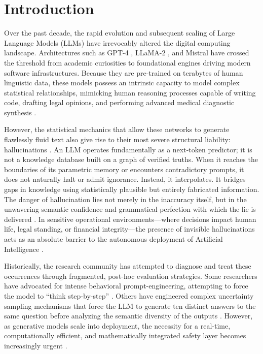 \documentclass{article}
\begin{document}
\section{Introduction}
\label{sec:introduction}

Over the past decade, the rapid evolution and subsequent scaling of Large Language Models (LLMs) have irrevocably altered the digital computing landscape. Architectures such as GPT-4 \cite{openai2023gpt4}, LLaMA-2 \cite{touvron2023llama2}, and Mistral \cite{jiang2023mistral} have crossed the threshold from academic curiosities to foundational engines driving modern software infrastructures. Because they are pre-trained on terabytes of human linguistic data, these models possess an intrinsic capacity to model complex statistical relationships, mimicking human reasoning processes capable of writing code, drafting legal opinions, and performing advanced medical diagnostic synthesis \cite{thirunavukarasu2023llmsmedicine}.

However, the statistical mechanics that allow these networks to generate flawlessly fluid text also give rise to their most severe structural liability: hallucinations \cite{alansari2024survey}. An LLM operates fundamentally as a next-token predictor; it is not a knowledge database built on a graph of verified truths. When it reaches the boundaries of its parametric memory or encounters contradictory prompts, it does not naturally halt or admit ignorance. Instead, it interpolates. It bridges gaps in knowledge using statistically plausible but entirely fabricated information. The danger of hallucination lies not merely in the inaccuracy itself, but in the unwavering semantic confidence and grammatical perfection with which the lie is delivered \cite{sharma2024trust}. In sensitive operational environments---where decisions impact human life, legal standing, or financial integrity---the presence of invisible hallucinations acts as an absolute barrier to the autonomous deployment of Artificial Intelligence \cite{huang2024trustllm}.

Historically, the research community has attempted to diagnose and treat these occurrences through fragmented, post-hoc evaluation strategies. Some researchers have advocated for intense behavioral prompt-engineering, attempting to force the model to ``think step-by-step'' \cite{wei2022chainofthought}. Others have engineered complex uncertainty sampling mechanisms that force the LLM to generate ten distinct answers to the same question before analyzing the semantic diversity of the outputs \cite{farquhar2024semantic}. However, as generative models scale into deployment, the necessity for a real-time, computationally efficient, and mathematically integrated safety layer becomes increasingly urgent \cite{kang2025uq}.
\end{document}
